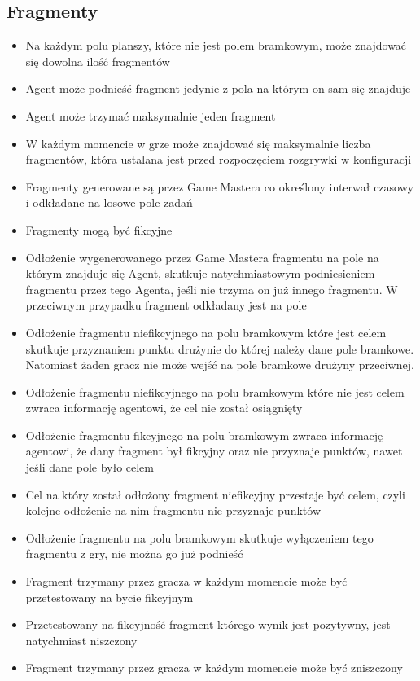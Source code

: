 \documentclass[Dokumentacja.tex]{subfiles}
\begin{document}
\subsection{Fragmenty}
\begin{itemize}
    \item Na każdym polu planszy, które nie jest polem bramkowym, może znajdować się dowolna ilość fragmentów
	\item Agent może podnieść fragment jedynie z pola na którym on sam się znajduje
    \item Agent może trzymać maksymalnie jeden fragment
    \item W każdym momencie w grze może znajdować się maksymalnie liczba fragmentów, która ustalana jest przed rozpoczęciem rozgrywki w konfiguracji
    \item Fragmenty generowane są przez Game Mastera co określony interwał czasowy i odkładane na losowe pole zadań
	\item Fragmenty mogą być fikcyjne
    \item Odłożenie wygenerowanego przez Game Mastera fragmentu na pole na którym znajduje się Agent, skutkuje natychmiastowym podniesieniem fragmentu przez tego Agenta, jeśli nie trzyma on już innego fragmentu. W przeciwnym przypadku fragment odkładany jest na pole
    \item Odłożenie fragmentu niefikcyjnego na polu bramkowym które jest celem skutkuje przyznaniem punktu drużynie do której należy dane pole bramkowe. Natomiast żaden gracz nie może wejść na pole bramkowe drużyny przeciwnej.
    \item Odłożenie fragmentu niefikcyjnego na polu bramkowym które nie jest celem zwraca informację agentowi, że cel nie został osiągnięty
	\item Odłożenie fragmentu fikcyjnego na polu bramkowym zwraca informację agentowi, że dany fragment był fikcyjny oraz nie przyznaje punktów, nawet jeśli dane pole było celem
    \item Cel na który został odłożony fragment niefikcyjny przestaje być celem, czyli kolejne odłożenie na nim fragmentu nie przyznaje punktów
    \item Odłożenie fragmentu na polu bramkowym skutkuje wyłączeniem tego fragmentu z gry, nie można go już podnieść
    \item Fragment trzymany przez gracza w każdym momencie może być przetestowany na bycie fikcyjnym
    \item Przetestowany na fikcyjność fragment którego wynik jest pozytywny, jest natychmiast niszczony
    \item Fragment trzymany przez gracza w każdym momencie może być zniszczony
\end{itemize}
\end{document}
